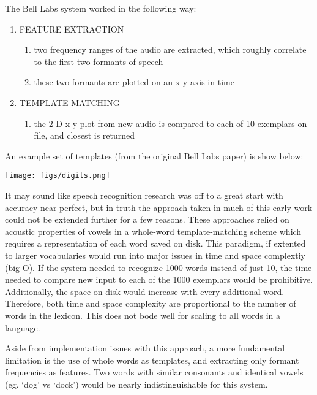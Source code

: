 \documentclass[10pt,a4paper]{article}
\begin{document}
The Bell Labs system worked in the following way:

\begin{enumerate}
\item FEATURE EXTRACTION
  \begin{enumerate}
  \item two frequency ranges of the audio are extracted, which roughly correlate to the first two formants of speech
  \item these two formants are plotted on an x-y axis in time
  \end{enumerate}
  
\item TEMPLATE MATCHING
  \begin{enumerate}
  \item the 2-D x-y plot from new audio is compared to each of 10 exemplars on file, and closest is returned
  \end{enumerate}
\end{enumerate}


An example set of templates (from the original Bell Labs paper) is show below:


\begin{center}
\texttt{[image: figs/digits.png]}
\end{center}


It may sound like speech recognition research was off to a great start with accuracy near perfect, but in truth the approach taken in much of this early work could not be extended further for a few reasons. These approaches relied on acoustic properties of vowels in a whole-word template-matching scheme which requires a representation of each word saved on disk. This paradigm, if extented to larger vocabularies would run into major issues in time and space complextiy (big O). If the system needed to recognize 1000 words instead of just 10, the time needed to compare new input to each of the 1000 exemplars would be prohibitive. Additionally, the space on disk would increase with every additional word. Therefore, both time and space complexity are proportional to the number of words in the lexicon. This does not bode well for scaling to all words in a language.

Aside from implementation issues with this approach, a more fundamental limitation is the use of whole words as templates, and extracting only formant frequencies as features. Two words with similar consonants and identical vowels (eg. `dog' vs `dock') would be nearly indistinguishable for this system.
\end{document}
